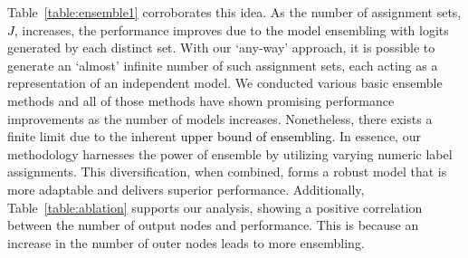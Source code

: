\documentclass[letterpaper]{article} %
\newcommand{\nj}[1]{\textcolor{black}{#1}}
\begin{document}
Table~\ref{table:ensemble1} corroborates this idea. As the number of assignment sets, \nj{$J$,} increases, %
the performance improves due to the model ensembling with logits generated by each distinct set. With our `any-way' approach, it is possible to generate an `almost' infinite number of such assignment sets, each acting as a representation of an independent model. We conducted various basic ensemble methods and all of those methods have shown promising performance improvements as the number of models increases. Nonetheless, there exists a finite limit due to the inherent \nj{upper bound of ensembling}.
In essence, our methodology harnesses the power of ensemble by utilizing varying numeric label assignments. This diversification, when combined, forms a robust model that is more adaptable and delivers superior performance. Additionally, Table~\ref{table:ablation} supports our analysis, showing a positive correlation between the number of output nodes and performance. This is because an increase in the number of outer nodes leads to more ensembling.
\end{document}

